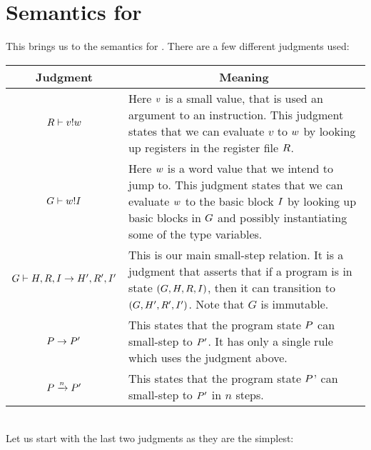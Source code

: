 \section{Semantics for \ATAL}

This brings us to the semantics for \ATAL. There are a few different judgments
used:

\begin{tabular}{|c|p{7.5 cm}|}
  \hline
  Judgment & \multicolumn{1}{|c|}{Meaning} \\\hline
  $\evalregs{\high R}{\high v}{\high w}$ & Here $\high v$ is a small value, that is used an argument to an instruction. This judgment states that we can evaluate $v$ to $\high w$ by looking up registers in the register file $\high R$. \\\hline
  $\evalcode{\high G}{\high w}{\high I}$ & Here $\high w$ is a word value that we intend to jump to. This judgment states that we can evaluate $\high w$ to the basic block $\high I$ by looking up basic blocks in $\high G$ and possibly instantiating some of the type variables. \\\hline
  $\execis{\high G}{\high H, \high R, \high I}{\high H', \high R', \high I'}$ & This is our main small-step relation. It is a judgment that asserts that if a program is in state $(\high G, \high H, \high R, \high I)$, then it can transition to $(\high G, \high H', \high R', \high I')$. Note that $G$ is immutable. \\\hline
  $\steps{\high P}{\high P'}$ & This states that the program state $\high P$ can small-step to $\high P'$. It has only a single rule which uses the judgment above. \\\hline
  $\stepsn{\high P}{n}{\high P'}$ & This states that the program state $\high P$' can small-step to $\high P'$ in $n$ steps. \\\hline
\end{tabular} \\

Let us start with the last two judgments as they are the simplest: \\

\begin{mathpar}
\end{mathpar}


